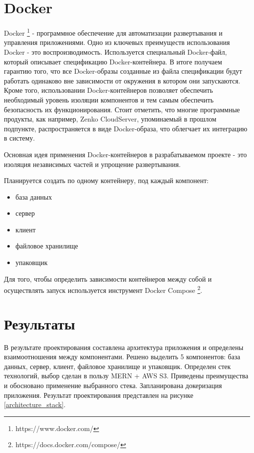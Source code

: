\documentclass[%
  a5paper,
  subf,
  href,
  master,
  dotsinheaders 
]{csse-fcs}
\begin{document}
\section{Docker}

Docker \footnote{https://www.docker.com/} - программное обеспечение для автоматизации развертывания и управления приложениями. 
Одно из ключевых преимуществ использования Docker - это воспроизводимость. Используется специальный Docker-файл, который описывает спецификацию Docker-контейнера. В итоге получаем гарантию того, что все Docker-образы созданные из файла спецификации будут работать одинаково вне зависимости от окружения в котором они запускаются. Кроме того, использовании Docker-контейнеров позволяет обеспечить необходимый уровень изоляции компонентов и тем самым обеспечить безопасность их функционирования. Стоит отметить, что многие программные продукты, как например, Zenko CloudServer, упоминаемый в прошлом подпункте, распространяется в виде Docker-образа, что облегчает их интеграцию в систему.

Основная идея применения Docker-контейнеров в разрабатываемом проекте - это изоляция независимых частей и упрощение развертывания.

Планируется создать по одному контейнеру, под каждый компонент:
\begin{itemize}
	\item база данных
	\item сервер
	\item клиент
	\item файловое хранилище
	\item упаковщик
\end{itemize}

Для того, чтобы определить зависимости контейнеров между собой и осуществлять запуск используется инструмент Docker Compose \footnote{https://docs.docker.com/compose/}.

\section{Результаты}

В результате проектирования составлена архитектура приложения и определены взаимоотношения между компонентами. Решено выделить 5 компонентов: база данных, сервер, клиент, файловое хранилище и упаковщик. Определен стек технологий, выбор сделан в пользу MERN + AWS S3. 
Приведены преимущества и обосновано применение выбранного стека. Запланирована докеризация приложения. Результат проектирования представлен на рисунке \ref{architecture_stack}.
\end{document}
